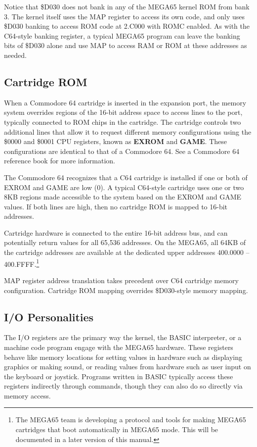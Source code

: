 Notice that \$D030 does not bank in any of the MEGA65 kernel ROM from bank 3.
The kernel itself uses the MAP register to access its own code, and only uses
\$D030 banking to access ROM code at 2.C000 with ROMC enabled. As with the
C64-style banking register, a typical MEGA65 program can leave the banking
bits of \$D030 alone and use MAP to access RAM or ROM at these addresses as
needed.

\subsection{Cartridge ROM}

When a Commodore 64 cartridge is inserted in the expansion port, the memory
system overrides regions of the 16-bit address space to access lines to the
port, typically connected to ROM chips in the cartridge. The cartridge
controls two additional lines that allow it to request different memory
configurations using the \$0000 and \$0001 CPU registers, known as {\bf EXROM}
and {\bf GAME}. These configurations are identical to that of a Commodore 64.
See a Commodore 64 reference book for more information.

The Commodore 64 recognizes that a C64 cartridge is installed if one or both
of EXROM and GAME are low (0). A typical C64-style cartridge uses one or two
8KB regions made accessible to the system based on the EXROM and GAME values.
If both lines are high, then no cartridge ROM is mapped to 16-bit addresses.

Cartridge hardware is connected to the entire 16-bit address bus, and can
potentially return values for all 65,536 addresses. On the MEGA65, all 64KB of
the cartridge addresses are available at the dedicated upper addresses
400.0000 -- 400.FFFF.\footnote{The MEGA65 team is developing a protocol and
tools for making MEGA65 cartridges that boot automatically in MEGA65 mode.
This will be documented in a later version of this manual.}

MAP register address translation takes precedent over C64 cartridge memory
configuration. Cartridge ROM mapping overrides \$D030-style memory mapping.

\subsection{I/O Personalities}

The I/O registers are the primary way the kernel, the BASIC interpreter, or a
machine code program engage with the MEGA65 hardware. These registers behave
like memory locations for setting values in hardware such as displaying
graphics or making sound, or reading values from hardware such as user input on
the keyboard or joystick. Programs written in BASIC typically access these
registers indirectly through commands, though they can also do so directly via
memory access.

